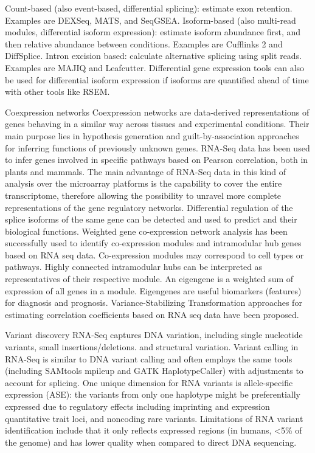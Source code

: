 Count-based (also event-based, differential splicing): estimate exon retention. Examples are DEXSeq, MATS, and SeqGSEA.
Isoform-based (also multi-read modules, differential isoform expression): estimate isoform abundance first, and then relative abundance between conditions. Examples are Cufflinks 2 and DiffSplice.
Intron excision based: calculate alternative splicing using split reads. Examples are MAJIQ and Leafcutter.
Differential gene expression tools can also be used for differential isoform expression if isoforms are quantified ahead of time with other tools like RSEM.

Coexpression networks
Coexpression networks are data-derived representations of genes behaving in a similar way across tissues and experimental conditions. Their main purpose lies in hypothesis generation and guilt-by-association approaches for inferring functions of previously unknown genes. RNA-Seq data has been used to infer genes involved in specific pathways based on Pearson correlation, both in plants and mammals. The main advantage of RNA-Seq data in this kind of analysis over the microarray platforms is the capability to cover the entire transcriptome, therefore allowing the possibility to unravel more complete representations of the gene regulatory networks. Differential regulation of the splice isoforms of the same gene can be detected and used to predict and their biological functions. Weighted gene co-expression network analysis has been successfully used to identify co-expression modules and intramodular hub genes based on RNA seq data. Co-expression modules may correspond to cell types or pathways. Highly connected intramodular hubs can be interpreted as representatives of their respective module. An eigengene is a weighted sum of expression of all genes in a module. Eigengenes are useful biomarkers (features) for diagnosis and prognosis. Variance-Stabilizing Transformation approaches for estimating correlation coefficients based on RNA seq data have been proposed.

Variant discovery
RNA-Seq captures DNA variation, including single nucleotide variants, small insertions/deletions. and structural variation. Variant calling in RNA-Seq is similar to DNA variant calling and often employs the same tools (including SAMtools mpileup and GATK HaplotypeCaller) with adjustments to account for splicing. One unique dimension for RNA variants is allele-specific expression (ASE): the variants from only one haplotype might be preferentially expressed due to regulatory effects including imprinting and expression quantitative trait loci, and noncoding rare variants. Limitations of RNA variant identification include that it only reflects expressed regions (in humans, \textless{}5\% of the genome) and has lower quality when compared to direct DNA sequencing.

